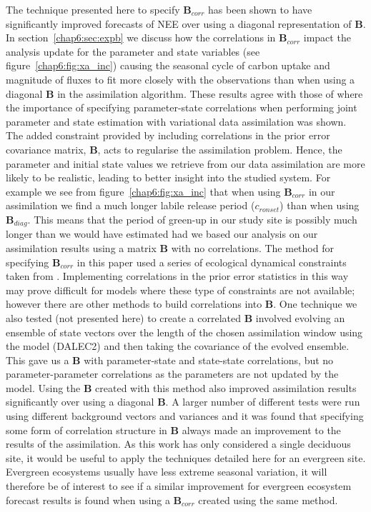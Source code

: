 The technique presented here to specify ${\mathbf{B}}_{corr}$ has been shown to have significantly improved forecasts of NEE over using a diagonal representation of ${\mathbf{B}}$. In section~\ref{chap6:sec:expb} we discuss how the correlations in ${\mathbf{B}}_{corr}$ impact the analysis update for the parameter and state variables (see figure~\ref{chap6:fig:xa_inc}) causing the seasonal cycle of carbon uptake and magnitude of fluxes to fit more closely with the observations than when using a diagonal ${\mathbf{B}}$ in the assimilation algorithm. These results agree with those of \citet{smith2009variational} where the importance of specifying parameter-state correlations when performing joint parameter and state estimation with variational data assimilation was shown. The added constraint provided by including correlations in the prior error covariance matrix, $\textbf{B}$, acts to regularise the assimilation problem. Hence, the parameter and initial state values we retrieve from our data assimilation are more likely to be realistic, leading to better insight into the studied system. For example we see from figure~\ref{chap6:fig:xa_inc} that when using ${\mathbf{B}}_{corr}$ in our assimilation we find a much longer labile release period ($c_{ronset}$) than when using ${\mathbf{B}}_{diag}$. This means that the period of green-up in our study site is possibly much longer than we would have estimated had we based our analysis on our assimilation results using a matrix ${\mathbf{B}}$ with no correlations. The method for specifying ${\mathbf{B}}_{corr}$ in this paper used a series of ecological dynamical constraints taken from \citet{Bloom2015}. Implementing correlations in the prior error statistics in this way may prove difficult for models where these type of constraints are not available; however there are other methods to build correlations into $\textbf{B}$. One technique we also tested (not presented here) to create a correlated $\textbf{B}$ involved evolving an ensemble of state vectors over the length of the chosen assimilation window using the model (DALEC2) and then taking the covariance of the evolved ensemble. This gave us a \textbf{B} with parameter-state and state-state correlations, but no parameter-parameter correlations as the parameters are not updated by the model. Using the $\textbf{B}$ created with this method also improved assimilation results significantly over using a diagonal $\textbf{B}$. A larger number of different tests were run using different background vectors and variances and it was found that specifying some form of correlation structure in $\textbf{B}$ always made an improvement to the results of the assimilation. As this work has only considered a single deciduous site, it would be useful to apply the techniques detailed here for an evergreen site. Evergreen ecosystems usually have less extreme seasonal variation, it will therefore be of interest to see if a similar improvement for evergreen ecosystem forecast results is found when using a ${\mathbf{B}}_{corr}$ created using the same method.

